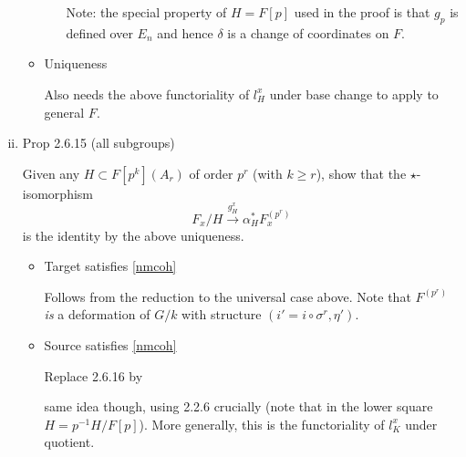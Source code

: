 \documentclass{rs}
\theoremstyle{definition}
\theoremstyle{remark}
\newcommand{\A}{\alpha}
\renewcommand{\d}{\delta}
\renewcommand{\=}{\approx}
\renewcommand{\-}{\sim}
\numberwithin{equation}{section}
\numberwithin{thm}{section}
\begin{document}
\begin{enumerate}[(i)]
\begin{itemize}
\begin{itemize}
   Note: the special property of $H = F[p]$ used in the proof is that 
   $g_p$ is defined over $E_n$ and hence $\d$ is a change of coordinates on $F$.  
  \end{itemize}

  \item Uniqueness 

  Also needs the above functoriality of $l_H^x$ under base change to apply to general $F$.  
 \end{itemize}

 \item Prop 2.6.15 (all subgroups) 

 Given any $H \subset F[p^k](A_r)$ of order $p^r$ (with $k \geq r$), 
 show that the $\star$-isomorphism 
 \[
  F_x/H \xrightarrow{g_H^x} \A_H^* F^{(p^r)}_x 
 \]
 is the identity by the above uniqueness.  
 \begin{itemize}
  \item Target satisfies \eqref{nmcoh} 

  Follows from the reduction to the universal case above.  
  Note that $F^{(p^r)}$ {\em is} a deformation of $G/k$ with structure $(i' = i \circ \sigma^r, \eta')$.  

  \item Source satisfies \eqref{nmcoh} 

  Replace 2.6.16 by 
  \begin{center}
  \end{center}
  same idea though, using 2.2.6 crucially (note that in the lower square $H = p^{-1}H/F[p]$).  
  More generally, this is the functoriality of $l_K^x$ under quotient.  
 \end{itemize}
\end{enumerate}
\end{document}
